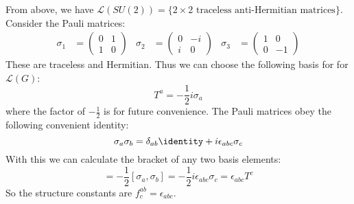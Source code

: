 \documentclass{jknotes}
\begin{document}
\begin{eg}
    From above, we have \(\mathcal{L}(SU(2))=\{2\times2\text{ traceless anti-Hermitian matrices}\}\). Consider the Pauli matrices:
    \begin{align}
        \sigma_1 &=
        \begin{pmatrix}
            0 & 1 \\
            1 & 0
        \end{pmatrix}
        &
        \sigma_2 &=
        \begin{pmatrix}
            0 & -i \\
            i & 0
        \end{pmatrix}
        &
        \sigma_3 &=
        \begin{pmatrix}
            1 & 0 \\
            0 & -1
        \end{pmatrix}
    \end{align}
    These are traceless and Hermitian. Thus we can choose the following basis for for \(\mathcal{L}(G)\):
    \begin{equation}
        T^a = -\frac{1}{2}i\sigma_a
    \end{equation}
    where the factor of \(-\frac{1}{2}\) is for future convenience. The Pauli matrices obey the following convenient identity:
    \begin{equation}
        \sigma_a\sigma_b = \delta_{ab}\identity + i\epsilon_{abc}\sigma_c
    \end{equation}
    With this we can calculate the bracket of any two basis elements:
    \begin{equation}
        [T^a,T^b] = -\frac{1}{2}[\sigma_a,\sigma_b] = -\frac{1}{2}i\epsilon_{abc}\sigma_c = \epsilon_{abc}T^c
    \end{equation}
    So the structure constants are \(f^{ab}_c = \epsilon_{abc}\).
\end{eg}
\end{document}
